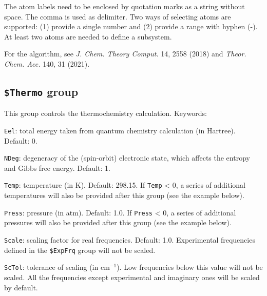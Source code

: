 \documentclass[12pt,english]{extarticle}
\begin{document}
The atom labels need to be enclosed by quotation marks as a string without space. The comma is used as delimiter. Two ways of selecting atoms are supported: (1) provide a single number and (2) provide a range with hyphen (-). At least two atoms are needed to define a subsystem.

For the algorithm, see \textit{J. Chem. Theory Comput.} 14, 2558 (2018) and \textit{Theor. Chem. Acc.} 140, 31 (2021).


\subsection{\texttt{\$Thermo} group} \label{sec:inp-thermo}

This group controls the thermochemistry calculation. Keywords:

\bigskip{}
\verb|Eel|: total energy taken from quantum chemistry calculation (in Hartree). Default: 0.

\bigskip{}
\verb|NDeg|: degeneracy of the (spin-orbit) electronic state, which affects the entropy and Gibbs free energy. Default: 1.

\bigskip{}
\verb|Temp|: temperature (in K). Default: 298.15. If \verb|Temp| < 0, a series of additional temperatures will also be provided after this group (see the example below).

\bigskip{}
\verb|Press|: pressure (in atm). Default: 1.0. If \verb|Press| < 0, a series of additional pressures will also be provided after this group (see the example below).

\bigskip{}
\verb|Scale|: scaling factor for real frequencies. Default: 1.0. Experimental frequencies defined in the \texttt{\$ExpFrq} group will not be scaled.

\bigskip{}
\verb|ScTol|: tolerance of scaling (in cm$^{-1}$). Low frequencies below this value will not be scaled. All the frequencies except experimental and imaginary ones will be scaled by default.
\end{document}
